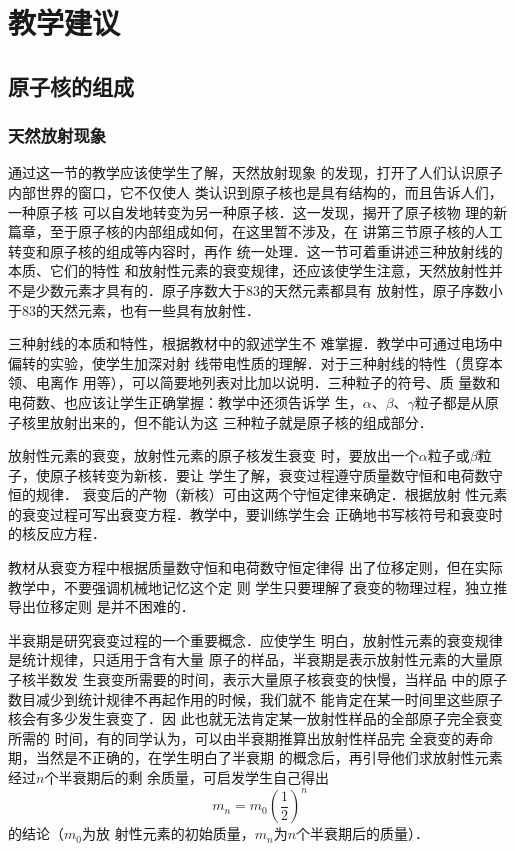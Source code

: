 \section{教学建议}
\subsection{原子核的组成}
\subsubsection{天然放射现象}

通过这一节的教学应该使学生了解，天然放射现象
的发现，打开了人们认识原子内部世界的窗口，它不仅使人
类认识到原子核也是具有结构的，而且告诉人们，一种原子核
可以自发地转变为另一种原子核．这一发现，揭开了原子核物
理的新篇章，至于原子核的内部组成如何，在这里暂不涉及，在
讲第三节原子核的人工转变和原子核的组成等内容时，再作
统一处理．这一节可着重讲述三种放射线的本质、它们的特性
和放射性元素的衰变规律，还应该使学生注意，天然放射性并
不是少数元素才具有的．原子序数大于83的天然元素都具有
放射性，原子序数小于83的天然元素，也有一些具有放射性．

三种射线的本质和特性，根据教材中的叙述学生不
难掌握．教学中可通过电场中偏转的实验，使学生加深对射
线带电性质的理解．对于三种射线的特性（贯穿本领、电离作
用等），可以简要地列表对比加以说明．三种粒子的符号、质
量数和电荷数、也应该让学生正确掌握：教学中还须告诉学
生，$\alpha$、$\beta$、$\gamma$粒子都是从原子核里放射出来的，但不能认为这
三种粒子就是原子核的组成部分．

放射性元素的衰变，放射性元素的原子核发生衰变
时，要放出一个$\alpha$粒子或$\beta$粒子，使原子核转变为新核．要让
学生了解，衰变过程遵守质量数守恒和电荷数守恒的规律．
衰变后的产物（新核）可由这两个守恒定律来确定．根据放射
性元素的衰变过程可写出衰变方程．教学中，要训练学生会
正确地书写核符号和衰变时的核反应方程．

教材从衰变方程中根据质量数守恒和电荷数守恒定律得
出了位移定则，但在实际教学中，不要强调机械地记忆这个定
则 学生只要理解了衰变的物理过程，独立推导出位移定则
是并不困难的．

半衰期是研究衰变过程的一个重要概念．应使学生
明白，放射性元素的衰变规律是统计规律，只适用于含有大量
原子的样品，半衰期是表示放射性元素的大量原子核半数发
生衰变所需要的时间，表示大量原子核衰变的快慢，当样品
中的原子数目减少到统计规律不再起作用的时候，我们就不
能肯定在某一时间里这些原子核会有多少发生衰变了．因
此也就无法肯定某一放射性样品的全部原子完全衰变所需的
时间，有的同学认为，可以由半衰期推算出放射性样品完
全衰变的寿命期，当然是不正确的，在学生明白了半衰期
的概念后，再引导他们求放射性元素经过$n$个半衰期后的剩
余质量，可启发学生自己得出
\[m_n=m_0\left(\frac{1}{2}\right)^n\]
的结论（$m_0$为放
射性元素的初始质量，$m_n$为$n$个半衰期后的质量）．


